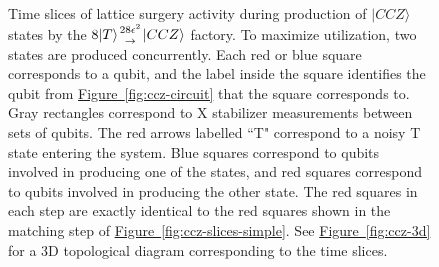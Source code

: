 \documentclass[superscriptaddress,notitlepage,longbibliography]{revtex4-1}
\newcommand{\fig}[1]{\hyperref[fig:#1]{Figure~\ref*{fig:#1}}}
\newcommand{\factory}[3]{$#1 \genfrac{}{}{0pt}{}{#2}{\rightarrow} {#3}$ factory}
\begin{document}
\begin{figure}[ht]
  \label{fig:ccz-slices-simple}
  \caption{
    Time slices of lattice surgery activity during production of a single $|CCZ\rangle$ state.
    Each red square corresponds to a qubit, and the label inside the red square identifies the qubit from \fig{ccz-circuit} that the square corresponds to.
    Gray rectangles correspond to X stabilizer measurements between sets of qubits.
    The red arrows labelled ``T" correspond to a noisy T state entering the system.
    It is possible to double the throughput shown here by interleaving the production of two states (shown in \fig{ccz-slices}).
  }

  \caption{
    Time slices of lattice surgery activity during production of $|CCZ\rangle$ states by the \factory{8|T\rangle}{28\epsilon^2}{|CCZ\rangle}.
    To maximize utilization, two states are produced concurrently.
    Each red or blue square corresponds to a qubit, and the label inside the square identifies the qubit from \fig{ccz-circuit} that the square corresponds to.
    Gray rectangles correspond to X stabilizer measurements between sets of qubits.
    The red arrows labelled ``T" correspond to a noisy T state entering the system.
    Blue squares correspond to qubits involved in producing one of the states, and red squares correspond to qubits involved in producing the other state.
    The red squares in each step are exactly identical to the red squares shown in the matching step of \fig{ccz-slices-simple}.
    See \fig{ccz-3d} for a 3D topological diagram corresponding to the time slices.
  }
  \label{fig:ccz-slices}
\end{figure}
\end{document}
